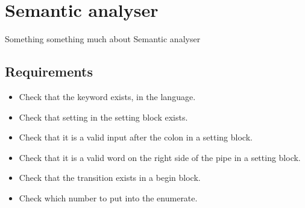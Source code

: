 \chapter{Semantic analyser}

Something something much about Semantic analyser

\section{Requirements}
\begin{itemize}
	\item Check that the keyword exists, in the language.
	\item Check that setting in the setting block exists.
	\item Check that it is a valid input after the colon in a setting block.
	\item Check that it is a valid word on the right side of the pipe in a setting block.
	\item Check that the transition exists in a begin block.
	\item Check which number to put into the enumerate.
\end{itemize}
